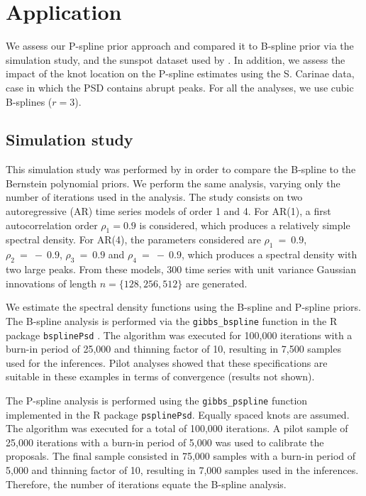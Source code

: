 \documentclass[aps,reprint,amsmath,amssymb,showpacs,showkeys]{revtex4-1}%
\begin{document}
\section{Application}
\label{sec:application}

We assess our P-spline prior approach and compared it to B-spline prior via the simulation study, and the sunspot dataset used by \cite{Edwards2018}.  In addition, we assess the impact of the knot location on the  P-spline estimates using the S. Carinae data, case in which the PSD contains abrupt peaks.  For all the analyses, we use cubic B-splines ($r=3$).

\subsection{Simulation study}

This simulation study was performed by \cite{Edwards2018} in order to compare the B-spline to the Bernstein polynomial priors.  We perform the same analysis, varying only the number of iterations used in the analysis.  The study consists on two autoregressive (AR) time series models of order 1 and 4.  For AR(1), a first autocorrelation order $\rho_1 = 0.9$ is considered, which produces a relatively simple spectral density.  For AR(4), the parameters considered are $\rho_1~=~0.9$, $\rho_2~=~-~0.9$, $\rho_3~=~0.9$ and $\rho_4~=~-~0.9$, which produces a spectral density with two large peaks.  From these models, 300 time series with unit variance Gaussian innovations of length $n = \{128, 256, 512\}$ are generated. 

We estimate the spectral density functions using the B-spline and P-spline priors.  The B-spline analysis is performed via the \texttt{gibbs\_bspline} function in the \textsf{R} package \texttt{bsplinePsd} \cite{Edwards:bsplinePsd:2018}.  The algorithm was executed for 100,000 iterations with a burn-in period of 25,000 and thinning factor of 10, resulting in 7,500 samples used for the inferences.  Pilot analyses showed that these specifications are suitable in these examples in terms of convergence (results not shown).  

The P-spline analysis is performed using the \texttt{gibbs\_pspline} function implemented in the \textsf{R} package \texttt{psplinePsd}.  Equally spaced knots are assumed.  The algorithm was executed for a total of 100,000 iterations.  A pilot sample of 25,000 iterations with a burn-in period of 5,000 was used to calibrate the proposals.  The final sample consisted in 75,000 samples with a burn-in period of 5,000 and thinning factor of 10, resulting in 7,000 samples used in the inferences.  Therefore, the number of iterations equate the B-spline analysis. 
\end{document}
